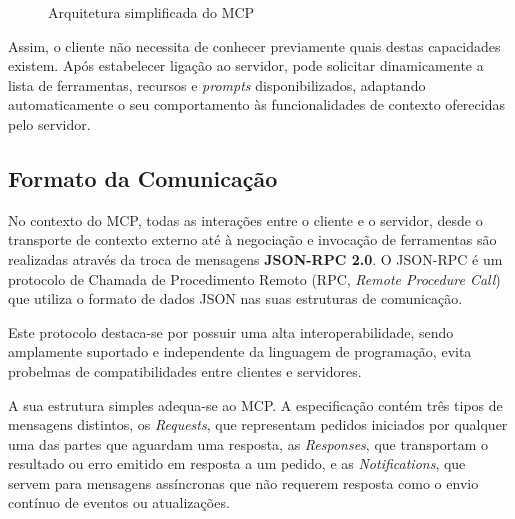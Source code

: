 \begin{figure}[h]
\caption{Arquitetura simplificada do MCP}
\label{fig:mcp_architecture}
\end{figure}

Assim, o cliente não necessita de conhecer previamente quais destas capacidades existem.
Após estabelecer ligação ao servidor, pode solicitar dinamicamente a lista de
ferramentas, recursos e \textit{prompts} disponibilizados, adaptando automaticamente
o seu comportamento às funcionalidades de contexto oferecidas pelo servidor.

\subsection{Formato da Comunicação}

No contexto do MCP, todas as interações entre o cliente e o servidor, desde o transporte de contexto externo até à negociação e invocação de ferramentas são realizadas através da troca de mensagens \textbf{JSON-RPC 2.0}\cite{ref_jsonrpc_spec}. O JSON-RPC é um protocolo de Chamada de Procedimento Remoto (RPC, \textit{Remote Procedure Call}) que utiliza o formato de dados JSON nas suas estruturas de comunicação.

Este protocolo destaca-se por possuir uma alta interoperabilidade, sendo amplamente suportado e independente da linguagem de programação, evita probelmas de compatibilidades entre clientes e servidores.

A sua estrutura simples adequa-se ao MCP. A especificação contém três tipos de mensagens distintos, os \textit{Requests}, que representam pedidos iniciados por qualquer uma das partes que aguardam uma resposta, as \textit{Responses}, que transportam o resultado ou erro emitido em resposta a um pedido, e as \textit{Notifications}, que servem para mensagens assíncronas que não requerem resposta como o envio contínuo de eventos ou atualizações.

